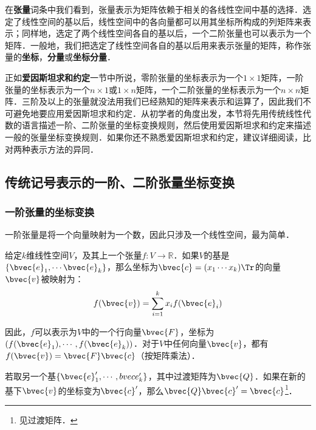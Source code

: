 \begin{issues}
\issueTODO
\end{issues}




在\textbf{张量}词条中我们看到，张量表示为矩阵依赖于相关的各线性空间中基的选择．选定了线性空间的基以后，线性空间中的各向量都可以用其坐标所构成的列矩阵来表示；同样地，选定了两个线性空间各自的基以后，一个二阶张量也可以表示为一个矩阵．一般地，我们把选定了线性空间各自的基以后用来表示张量的矩阵，称作张量的\textbf{坐标}，\textbf{分量}或\textbf{坐标分量}．

正如\textbf{爱因斯坦求和约定}一节中所说，零阶张量的坐标表示为一个$1\times 1$矩阵，一阶张量的坐标表示为一个$n\times 1$或$1\times n$矩阵，一个二阶张量的坐标表示为一个$n\times n$矩阵．三阶及以上的张量就没法用我们已经熟知的矩阵来表示和运算了，因此我们不可避免地要应用爱因斯坦求和约定．从初学者的角度出发，本节将先用传统线性代数的语言描述一阶、二阶张量的坐标变换规则，然后使用爱因斯坦求和约定来描述一般的张量坐标变换规则．如果你还不熟悉爱因斯坦求和约定，建议详细阅读，比对两种表示方法的异同．

\subsection{传统记号表示的一阶、二阶张量坐标变换}
\subsubsection{一阶张量的坐标变换}
一阶张量是将一个向量映射为一个数，因此只涉及一个线性空间，最为简单．

给定$k$维线性空间$V$，及其上一个张量$f:V\rightarrow\mathbb{R}$．如果$V$的基是$\{\bvec{e}_1, \cdots\bvec{e}_k\}$，那么坐标为$\bvec{c}=(x_1\cdots x_k)\Tr$的向量$\bvec{v}$被映射为：
\begin{equation}
f(\bvec{v})=\sum\limits_{i=1}^k x_if(\bvec{e}_i)
\end{equation}

因此，$f$可以表示为$V$中的一个行向量$\bvec{F}$，坐标为$(f(\bvec{e}_1), \cdots, f(\bvec{e}_k))$．对于$V$中任何向量$\bvec{v}$，都有$f(\bvec{v})=\bvec{F}\bvec{c}$（按矩阵乘法）．

若取另一个基$\{\bvec{e}_1', \cdots, \\bvec{e}_k'\}$，其中过渡矩阵为$\bvec{Q}$．如果在新的基下$\bvec{v}$的坐标变为$\bvec{c}'$，那么$\bvec{Q}\bvec{c}'=\bvec{c}$\footnote{见过渡矩阵．}．

